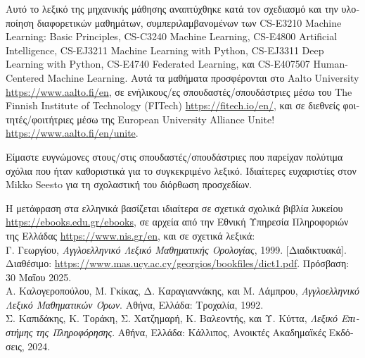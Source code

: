 \documentclass[journal,12pt,onecolumn]{article}
\begin{document}
\noindent \foreignlanguage{greek}{Αυτό το λεξικό της μηχανικής μάθησης αναπτύχθηκε κατά τον σχεδιασμό
και την υλοποίηση διαφορετικών μαθημάτων, συμπεριλαμβανομένων των} CS-E3210 Machine Learning: 
Basic Principles, CS-C3240 Machine Learning, CS-E4800 Artificial Intelligence, CS-EJ3211 Machine Learning with 
Python, CS-EJ3311 Deep Learning with Python, CS-E4740 Federated Learning,
\foreignlanguage{greek}{και} CS-E407507 Human-Centered Machine Learning. \foreignlanguage{greek}{Αυτά τα 
μαθήματα προσφέρονται στο} Aalto University \url{https://www.aalto.fi/en}, \foreignlanguage{greek}{σε 
ενήλικους/ες σπουδαστές/σπουδάστριες μέσω του} The Finnish Institute of Technology (FITech) 
\url{https://fitech.io/en/}, \foreignlanguage{greek}{και σε διεθνείς φοιτητές/φοιτήτριες μέσω της} 
European University Alliance Unite! \url{https://www.aalto.fi/en/unite}.

\noindent \foreignlanguage{greek}{Είμαστε ευγνώμονες στους/στις σπουδαστές/σπουδάστριες που παρείχαν 
πολύτιμα σχόλια που ήταν καθοριστικά για το συγκεκριμένο λεξικό. Ιδιαίτερες ευχαριστίες στον} Mikko 
Seesto \foreignlanguage{greek}{για τη σχολαστική του διόρθωση προσχεδίων.} 

\noindent \foreignlanguage{greek}{Η μετάφραση στα ελληνικά βασίζεται ιδιαίτερα σε σχετικά σχολικά βιβλία λυκείου} 
\url{https://ebooks.edu.gr/ebooks}, 
\foreignlanguage{greek}{σε αρχεία από την Εθνική Υπηρεσία Πληροφοριών της Ελλάδας} \url{https://www.nis.gr/en}, 
\foreignlanguage{greek}{και σε σχετικά λεξικά:} \\
\foreignlanguage{greek}{Γ. Γεωργίου}, \textit{\foreignlanguage{greek}{Αγγλοελληνικό Λεξικό Μαθηματικής Ορολογίας}}, 
1999. \foreignlanguage{greek}{[Διαδικτυακά]. Διαθέσιμο:} \url{https://www.mas.ucy.ac.cy/georgios/bookfiles/dict1.pdf}. 
\foreignlanguage{greek}{Πρόσβαση: 30 Μαΐου 2025.}\\
\foreignlanguage{greek}{Α. Καλογεροπούλου, Μ. Γκίκας, Δ. Καραγιαννάκης, και Μ. Λάμπρου}, 
\textit{\foreignlanguage{greek}{Αγγλοελληνικό Λεξικό Μαθηματικών Όρων}}. \foreignlanguage{greek}{Αθήνα, Ελλάδα: Τροχαλία, 1992.}\\
\foreignlanguage{greek}{Σ. Καπιδάκης, Κ. Τοράκη, Σ. Χατζημαρή, Κ. Βαλεοντής, και Υ. Κύττα}, 
\textit{\foreignlanguage{greek}{Λεξικό Επιστήμης της Πληροφόρησης}}. \foreignlanguage{greek}{Αθήνα, Ελλάδα: Κάλλιπος, 
Ανοικτές Ακαδημαϊκές Εκδόσεις, 2024.}


\tableofcontents

\newpage 


\newpage
\end{document}
